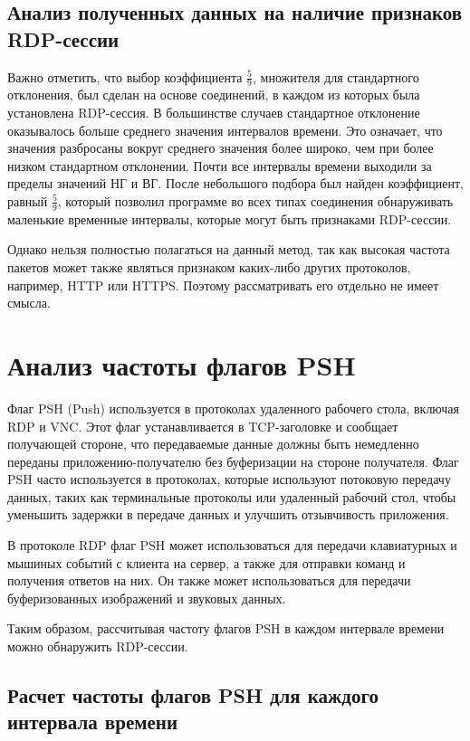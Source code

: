 \documentclass[bachelor, och, coursework]{SCWorks}
\begin{document}
\subsection{Анализ полученных данных на наличие признаков RDP-сессии}

Важно отметить, что выбор коэффициента $\frac{5}{9}$, множителя для стандартного отклонения, был сделан на основе соединений, 
в каждом из которых была установлена RDP-сессия. В большинстве случаев стандартное отклонение оказывалось больше среднего значения интервалов времени. 
Это означает, что значения разбросаны вокруг среднего значения более широко, чем при более низком стандартном отклонении. Почти все интервалы времени 
выходили за пределы значений НГ и ВГ. После небольшого подбора был найден коэффициент, равный $\frac{5}{9}$, который позволил программе во всех
типах соединения обнаруживать маленькие временные интервалы, которые могут быть признаками RDP-сессии.


Однако нельзя полностью полагаться на данный метод, так как высокая частота пакетов может также являться признаком каких-либо других протоколов, например,
HTTP или HTTPS. Поэтому рассматривать его отдельно не имеет смысла. 


\section{Анализ частоты флагов PSH}


Флаг PSH (Push) используется в протоколах удаленного рабочего стола, включая RDP и VNC. 
Этот флаг устанавливается в TCP-заголовке и сообщает получающей стороне, что передаваемые данные должны 
быть немедленно переданы приложению-получателю без буферизации на стороне получателя. Флаг PSH часто 
используется в протоколах, которые используют потоковую передачу данных, таких как терминальные протоколы 
или удаленный рабочий стол, чтобы уменьшить задержки в передаче данных и улучшить отзывчивость приложения.

В протоколе RDP флаг PSH может использоваться для передачи клавиатурных и мышиных событий с клиента на сервер, 
а также для отправки команд и получения ответов на них. Он также может использоваться для передачи буферизованных 
изображений и звуковых данных. 

Таким образом, рассчитывая частоту флагов PSH в каждом интервале времени можно обнаружить RDP-сессии. 

\subsection{Расчет частоты флагов PSH для каждого интервала времени}
\end{document}
